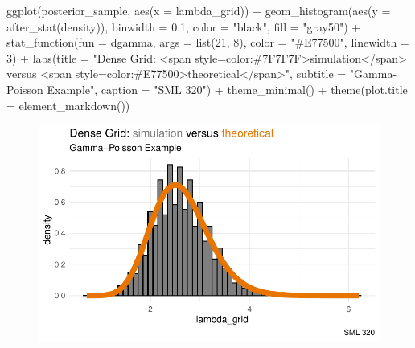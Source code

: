 \documentclass[
  letterpaper,
  DIV=11,
  numbers=noendperiod]{scrartcl}
\newenvironment{Shaded}{\begin{snugshade}}{\end{snugshade}}
\newcommand{\AttributeTok}[1]{\textcolor[rgb]{0.40,0.45,0.13}{#1}}
\newcommand{\DecValTok}[1]{\textcolor[rgb]{0.68,0.00,0.00}{#1}}
\newcommand{\FloatTok}[1]{\textcolor[rgb]{0.68,0.00,0.00}{#1}}
\newcommand{\FunctionTok}[1]{\textcolor[rgb]{0.28,0.35,0.67}{#1}}
\newcommand{\NormalTok}[1]{\textcolor[rgb]{0.00,0.23,0.31}{#1}}
\newcommand{\SpecialCharTok}[1]{\textcolor[rgb]{0.37,0.37,0.37}{#1}}
\newcommand{\StringTok}[1]{\textcolor[rgb]{0.13,0.47,0.30}{#1}}
\begin{document}
\begin{Shaded}
\begin{Highlighting}[]
\FunctionTok{ggplot}\NormalTok{(posterior\_sample, }\FunctionTok{aes}\NormalTok{(}\AttributeTok{x =}\NormalTok{ lambda\_grid)) }\SpecialCharTok{+} 
  \FunctionTok{geom\_histogram}\NormalTok{(}\FunctionTok{aes}\NormalTok{(}\AttributeTok{y =} \FunctionTok{after\_stat}\NormalTok{(density)), }
                 \AttributeTok{binwidth =} \FloatTok{0.1}\NormalTok{,}
                 \AttributeTok{color =} \StringTok{"black"}\NormalTok{,}
                 \AttributeTok{fill =} \StringTok{"gray50"}\NormalTok{) }\SpecialCharTok{+} 
  \FunctionTok{stat\_function}\NormalTok{(}\AttributeTok{fun =}\NormalTok{ dgamma, }\AttributeTok{args =} \FunctionTok{list}\NormalTok{(}\DecValTok{21}\NormalTok{, }\DecValTok{8}\NormalTok{),}
                \AttributeTok{color =} \StringTok{"\#E77500"}\NormalTok{, }\AttributeTok{linewidth =} \DecValTok{3}\NormalTok{) }\SpecialCharTok{+} 
  \FunctionTok{labs}\NormalTok{(}\AttributeTok{title =} \StringTok{"Dense Grid: \textless{}span style=\textquotesingle{}color:\#7F7F7F\textquotesingle{}\textgreater{}simulation\textless{}/span\textgreater{} versus \textless{}span style=\textquotesingle{}color:\#E77500\textquotesingle{}\textgreater{}theoretical\textless{}/span\textgreater{}"}\NormalTok{,}
         \AttributeTok{subtitle =} \StringTok{"Gamma{-}Poisson Example"}\NormalTok{,}
         \AttributeTok{caption =} \StringTok{"SML 320"}\NormalTok{) }\SpecialCharTok{+}
  \FunctionTok{theme\_minimal}\NormalTok{() }\SpecialCharTok{+}
  \FunctionTok{theme}\NormalTok{(}\AttributeTok{plot.title =} \FunctionTok{element\_markdown}\NormalTok{())}
\end{Highlighting}
\end{Shaded}

\begin{figure}[H]

{\centering \includegraphics{ps4_code_files/figure-pdf/unnamed-chunk-17-1.pdf}

}

\end{figure}
\end{document}

